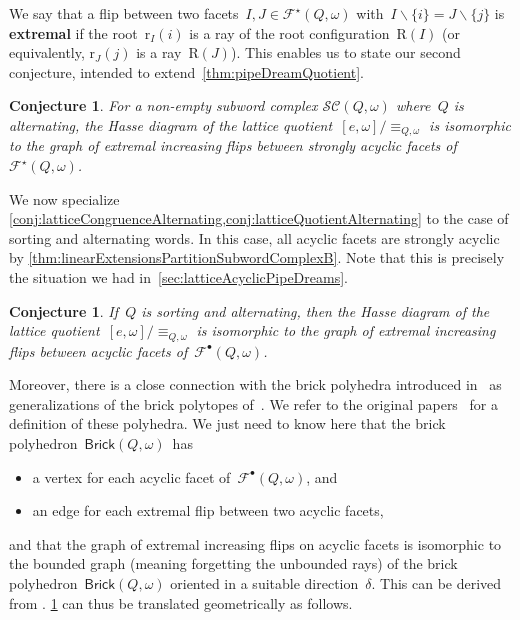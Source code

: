 \documentclass[reqno]{amsart}
\newtheorem{conjecture}[theorem]{Conjecture}
\theoremstyle{definition}
\newcommand{\ssm}{\smallsetminus} %
\newcommand{\defn}[1]{\textbf{\textsf{\color{PineGreen} #1}}} %
\newcommand{\subwordComplex}{\mathcal{SC}} %
\newcommand{\Roots}{\mathrm{R}} %
\newcommand{\rootFunction}[2]{\mathrm{r}_{#1}(#2)} %
\newcommand{\subwordAcyclicFacets}{\mathcal{F}^\bullet} %
\newcommand{\subwordStronglyAcyclicFacets}{\mathcal{F}^\star} %
\newcommand{\brickPolyhedron}{\mathsf{Brick}} %
\begin{document}
We say that a flip between two facets~$I, J \in \subwordStronglyAcyclicFacets(Q, \omega)$ with~$I \ssm \{i\} = J \ssm \{j\}$ is \defn{extremal} if the root~$\rootFunction{I}{i}$ is a ray of the root configuration~$\Roots(I)$ (or equivalently, $\rootFunction{J}{j}$ is a ray~$\Roots(J)$).
This enables us to state our second conjecture, intended to extend~\cref{thm:pipeDreamQuotient}.

\begin{conjecture}
\label{conj:latticeQuotientAlternating}
For a non-empty subword complex $\subwordComplex(Q,\omega)$ where~$Q$ is alternating, the Hasse diagram of the lattice quotient~$[e, \omega]/\equiv_{Q, \omega}$ is isomorphic to the graph of extremal increasing flips between strongly acyclic facets of~$\subwordStronglyAcyclicFacets(Q, \omega)$.
\end{conjecture}

We now specialize \cref{conj:latticeCongruenceAlternating,conj:latticeQuotientAlternating} to the case of sorting and alternating words.
In this case, all acyclic facets are strongly acyclic by \cref{thm:linearExtensionsPartitionSubwordComplexB}.
Note that this is precisely the situation we had in~\cref{sec:latticeAcyclicPipeDreams}.

\begin{conjecture}
\label{conj:latticeQuotientSortingAlternating}
If~$Q$ is sorting and alternating, then the Hasse diagram of the lattice quotient~$[e, \omega]/\equiv_{Q, \omega}$ is isomorphic to the graph of extremal increasing flips between acyclic facets of~$\subwordAcyclicFacets(Q, \omega)$.
\end{conjecture}

Moreover, there is a close connection with the brick polyhedra introduced in~\cite{JahnStump} as generalizations of the brick polytopes of~\cite{PilaudSantos-brickPolytope, PilaudStump-brickPolytope}.
We refer to the original papers~\cite{PilaudSantos-brickPolytope, PilaudStump-brickPolytope, JahnStump} for a definition of these polyhedra.
We just need to know here that the brick polyhedron~$\brickPolyhedron(Q, \omega)$~has
\begin{itemize}
\item a vertex for each acyclic facet of~$\subwordAcyclicFacets(Q, \omega)$, and
\item an edge for each extremal flip between two acyclic facets,
\end{itemize}
and that the graph of extremal increasing flips on acyclic facets is isomorphic to the bounded graph (meaning forgetting the unbounded rays) of the brick polyhedron~$\brickPolyhedron(Q, \omega)$ oriented in a suitable direction~$\delta$.
This can be derived from \cite[Thm.~4.4]{JahnStump}.
\cref{conj:latticeQuotientSortingAlternating} can thus be translated geometrically as follows.
\end{document}
